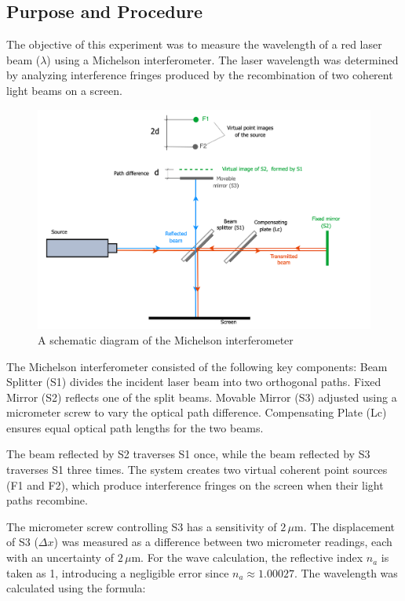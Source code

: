 \subsection{Purpose and Procedure}


The objective of this experiment was to measure the wavelength of a red laser beam (\(\lambda\)) using a Michelson interferometer. The laser wavelength was determined by analyzing interference fringes produced by the recombination of two coherent light beams on a screen.  

\begin{figure}[h]
    \centering
    \includegraphics[width=0.9\linewidth]{The_Michelson_interferometer/finalimage1.png}
    \caption{A schematic diagram of the Michelson interferometer}
    \label{fig:michelson}
\end{figure}

The Michelson interferometer consisted of the following key components: Beam Splitter (S1) divides the incident laser beam into two orthogonal paths. Fixed Mirror (S2) reflects one of the split beams. Movable Mirror (S3) adjusted using a micrometer screw to vary the optical path difference. Compensating Plate (Lc) ensures equal optical path lengths for the two beams.  

The beam reflected by S2 traverses S1 once, while the beam reflected by S3 traverses S1 three times. The system creates two virtual coherent point sources (F1 and F2), which produce interference fringes on the screen when their light paths recombine.  

The micrometer screw controlling S3 has a sensitivity of \(2 \, \mu \text{m}\). The displacement of S3 (\(\Delta x\)) was measured as a difference between two micrometer readings, each with an uncertainty of \(2 \, \mu \text{m}\). For the wave calculation, the reflective index \(n_a\) is taken as 1, introducing a negligible error since \(n_a \approx 1.00027\). 
The wavelength was calculated using the formula:  

